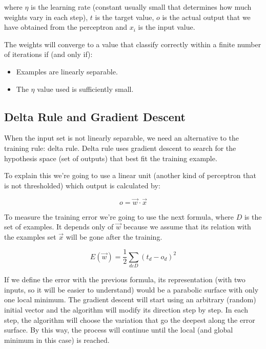 \documentclass{article}
\begin{document}
	where $\eta$ is the learning rate (constant usually small that determines how much weights vary in each step), $t$ is the target value, $o$ is the actual output that we have obtained from the perceptron and $x_{i}$ is the input value.

	The weights will converge to a value that classify correctly within a finite number of iterations if (and only if):
	\begin{itemize}
		\item Examples are linearly separable.
		\item The $\eta$ value used is sufficiently small.
	\end{itemize}
	
	\subsection{Delta Rule and Gradient Descent}
	When the input set is not linearly separable, we need an alternative to the training rule: delta rule. Delta rule uses gradient descent to search for the hypothesis space (set of outputs) that best fit the training example. 

	To explain this we’re going to use a linear unit (another kind of perceptron that is not thresholded) which output is calculated by:
	
	\begin{equation}
		\label{linear_unit}
		o = \vec{w} \cdot \vec{x}
	\end{equation}

	To measure the training error we’re going to use the next formula, where $D$ is the set of examples. It depends only of $\vec{w}$ because we assume that its relation with the examples set $\vec{x}$ will be gone after the training.

	\begin{equation}
		\label{error_function_full_square}
		E(\vec{w}) = \frac{1}{2} \sum_{d \varepsilon D} (t_d-o_d)^2 
	\end{equation}

	If we define the error with the previous formula, its representation (with two inputs, so it will be easier to understand) would be a parabolic surface with only one local minimum. The gradient descent will start using an arbitrary (random) initial vector and the algorithm will modify its direction step by step. In each step, the algorithm will choose the variation that go the deepest along the error surface. By this way, the process will continue until the local (and global minimum in this case) is reached.
\end{document}
